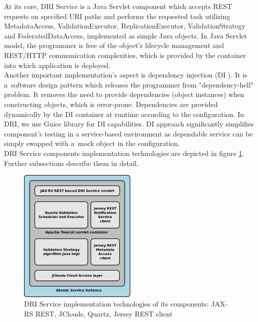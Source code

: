 At its core, DRI Service is a Java Servlet \cite{java-servlet}
component which accepts REST requests on specified URI paths and performs the
requested task utilizing MetadataAccess, ValidationExecutor, 
ReplicationExecutor, ValidationStrategy and FederatedDataAccess, implemented as
simple Java objects. In Java Servlet model, the programmer is free of the
object's lifecycle management and REST/HTTP communication complexities, which
is provided by the container into which application is deployed.\\

Another important implementation's aspect is dependency injection (DI \cite{di,di-book}). It is
a~software design pattern which releases the programmer from "dependency-hell"
problem. It removes the need to provide dependencies (object instances) when
constructing objects, which is error-prone. Dependencies are provided
dynamically by the DI container at runtime according to the configuration.
In DRI, we use Guice library \cite{guice} for DI capabilities. DI approach
significantly simplifies component's testing in a service-based environment as
dependable service can be simply swapped with a~mock object in the
configuration.\\

DRI Service components implementation technologies are depicted in figure
\ref{fig:dri-impl-technologies}. Further subsections describe them in detail.

\begin{figure}[h!]
	\centering
	\includegraphics[width=0.5\textwidth]{images/dri-impl-technologies.png}
	\caption{DRI Service implementation technologies of its components: 
	JAX-RS REST, JClouds, Quartz, Jersey REST client}
	\label{fig:dri-impl-technologies}
\end{figure}
 
